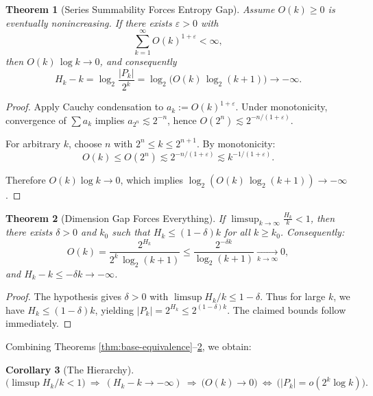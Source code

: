\documentclass[11pt]{article}
\newtheorem{theorem}{Theorem}
\newtheorem{corollary}[theorem]{Corollary}
\theoremstyle{definition}
\begin{document}
\begin{theorem}[Series Summability Forces Entropy Gap]\label{thm:series-to-entropy}
Assume $O(k)\ge 0$ is eventually nonincreasing. If there exists $\varepsilon>0$ with
\begin{equation}
\sum_{k=1}^{\infty} O(k)^{1+\varepsilon} < \infty,
\end{equation}
then $O(k)\,\log k\to 0$, and consequently
\begin{equation}
H_k-k=\log_2\frac{|P_k|}{2^k}=\log_2\big(O(k)\,\log_2(k+1)\big)\longrightarrow -\infty.
\end{equation}
\end{theorem}

\begin{proof}
Apply Cauchy condensation to $a_k:=O(k)^{1+\varepsilon}$. Under monotonicity, convergence of $\sum a_k$ implies $a_{2^n}\lesssim 2^{-n}$, hence $O(2^n)\lesssim 2^{-n/(1+\varepsilon)}$. 

For arbitrary $k$, choose $n$ with $2^n\le k\le 2^{n+1}$. By monotonicity:
$$O(k)\le O(2^n)\lesssim 2^{-n/(1+\varepsilon)}\lesssim k^{-1/(1+\varepsilon)}.$$

Therefore $O(k)\log k\to 0$, which implies $\log_2(O(k)\,\log_2(k+1))\to -\infty$.
\end{proof}

\begin{theorem}[Dimension Gap Forces Everything]\label{thm:dimension-gap}
If $\displaystyle \limsup_{k\to\infty}\frac{H_k}{k}<1$, then there exists $\delta>0$ and $k_0$ such that $H_k\le (1-\delta)k$ for all $k\ge k_0$. Consequently:
\begin{equation}
O(k)=\frac{2^{H_k}}{2^k\,\log_2(k+1)}\le\frac{2^{-\delta k}}{\log_2(k+1)}\xrightarrow[k\to\infty]{}0,
\end{equation}
and $H_k-k\le -\delta k\to -\infty$.
\end{theorem}

\begin{proof}
The hypothesis gives $\delta>0$ with $\limsup H_k/k\le 1-\delta$. Thus for large $k$, we have $H_k\le (1-\delta)k$, yielding $|P_k|=2^{H_k}\le 2^{(1-\delta)k}$. The claimed bounds follow immediately.
\end{proof}

Combining Theorems \ref{thm:base-equivalence}--\ref{thm:dimension-gap}, we obtain:

\begin{corollary}[The Hierarchy]
\begin{equation}\label{eq:lattice}
\big(\limsup H_k/k<1\big)\ \Rightarrow\ (H_k-k\to-\infty)\ \Rightarrow\ \big(O(k)\to 0\big)\ \Leftrightarrow\ \big(|P_k|=o(2^k\log k)\big).
\end{equation}
\end{corollary}
\end{document}
